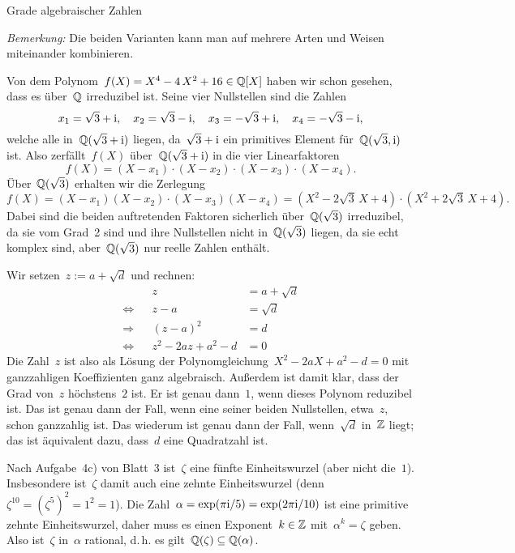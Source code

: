 \documentclass{algblatt}
\begin{document}
\begin{aufgabe}{Grade algebraischer Zahlen}
\begin{loesungE}
\emph{Bemerkung:} Die beiden Varianten kann man auf mehrere Arten und Weisen
miteinander kombinieren.

\item Von dem Polynom~$f(X) = X^4 - 4\,X^2 + 16 \in \mathbb{Q}[X]$ haben wir schon
gesehen, dass es über~$\mathbb{Q}$ irreduzibel ist. Seine vier Nullstellen sind die
Zahlen
\[ x_1 = \sqrt{3} + \mathrm{i},\quad x_2 = \sqrt{3} - \mathrm{i},\quad x_3 = -\sqrt{3} +
\mathrm{i},\quad x_4 = -\sqrt{3} - \mathrm{i}, \]
welche alle in~$\mathbb{Q}(\sqrt{3} + \mathrm{i})$ liegen, da~$\sqrt{3} + \mathrm{i}$ ein primitives
Element für~$\mathbb{Q}(\sqrt{3},\mathrm{i})$ ist. Also zerfällt~$f(X)$
über~$\mathbb{Q}(\sqrt{3}+\mathrm{i})$ in die vier Linearfaktoren
\[ f(X) = (X-x_1) \cdot (X-x_2) \cdot (X-x_3) \cdot (X-x_4). \]
Über~$\mathbb{Q}(\sqrt{3})$ erhalten wir die Zerlegung
\[ f(X) = (X-x_1) (X-x_2) \cdot (X-x_3) (X-x_4) =
  (X^2 - 2\sqrt{3}\,X + 4) \cdot (X^2 + 2\sqrt{3}\,X + 4). \]
Dabei sind die beiden auftretenden Faktoren sicherlich über~$\mathbb{Q}(\sqrt{3})$
irreduzibel, da sie vom Grad~2 sind und ihre Nullstellen nicht
in~$\mathbb{Q}(\sqrt{3})$ liegen, da sie echt komplex sind,
aber~$\mathbb{Q}(\sqrt{3})$ nur reelle Zahlen enthält.

\item Wir setzen~$z := a + \sqrt{d}$ und rechnen:
\begin{align*}
  && z &= a + \sqrt{d} \\
  \Longleftrightarrow&& z - a &= \sqrt{d} \\
  \Longrightarrow&& (z-a)^2 &= d \\
  \Longleftrightarrow && z^2 - 2az + a^2-d &= 0
\end{align*}
Die Zahl~$z$ ist also als Lösung der Polynomgleichung~$X^2 - 2aX + a^2-d = 0$
mit ganzzahligen Koeffizienten ganz algebraisch. Außerdem ist damit klar, dass
der Grad von~$z$ höchstens~$2$ ist. Er ist genau dann~$1$, wenn dieses Polynom
reduzibel ist. Das ist genau dann der Fall, wenn eine seiner beiden
Nullstellen, etwa~$z$, schon ganzzahlig ist. Das wiederum ist genau dann der
Fall, wenn~$\sqrt{d}$ in~$\mathbb{Z}$ liegt; das ist äquivalent dazu, dass~$d$ eine
Quadratzahl ist.

\item Nach Aufgabe~4c) von Blatt~3 ist~$\zeta$ eine fünfte Einheitswurzel (aber
nicht die~$1$). Insbesondere ist~$\zeta$ damit auch eine zehnte Einheitswurzel
(denn~$\zeta^{10} = (\zeta^5)^2 = 1^2 = 1$). Die Zahl~$\alpha = \exp(\pi\mathrm{i}/5) =
\exp(2\pi\mathrm{i}/10)$ ist eine primitive zehnte Einheitswurzel, daher muss es einen
Exponent~$k \in \mathbb{Z}$ mit~$\alpha^k = \zeta$ geben. Also ist~$\zeta$ in~$\alpha$
rational, d.\,h. es gilt~$\mathbb{Q}(\zeta) \subseteq \mathbb{Q}(\alpha)$.


\end{loesungE}
\end{aufgabe}
\end{document}
